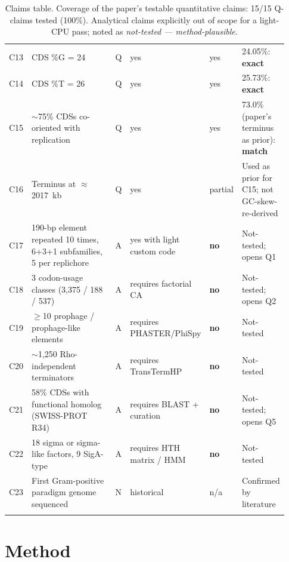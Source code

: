 \documentclass[11pt,letterpaper]{article}
\begin{document}
\begin{longtable}{@{}p{0.03\linewidth}p{0.55\linewidth}p{0.05\linewidth}p{0.12\linewidth}p{0.08\linewidth}p{0.10\linewidth}@{}}
C13 & CDS \%G = 24                                                                 & Q & yes                       & yes     & 24.05\%: \textbf{exact} \\
C14 & CDS \%T = 26                                                                 & Q & yes                       & yes     & 25.73\%: \textbf{exact} \\
C15 & $\sim$75\% CDSs co-oriented with replication                                 & Q & yes                       & yes     & 73.0\% (paper's terminus as prior): \textbf{match} \\
C16 & Terminus at $\approx$ \SI{2017}{kb}                                          & Q & yes                       & partial & Used as prior for C15; not GC-skew-re-derived \\
C17 & 190-bp element repeated 10 times, 6+3+1 subfamilies, 5 per replichore        & A & yes with light custom code& \textbf{no}      & Not-tested; opens Q1 \\
C18 & 3 codon-usage classes (3,375 / 188 / 537)                                    & A & requires factorial CA     & \textbf{no}      & Not-tested; opens Q2 \\
C19 & $\geq$10 prophage / prophage-like elements                                   & A & requires PHASTER/PhiSpy   & \textbf{no}      & Not-tested \\
C20 & $\sim$1,250 Rho-independent terminators                                      & A & requires TransTermHP      & \textbf{no}      & Not-tested \\
C21 & 58\% CDSs with functional homolog (SWISS-PROT R34)                           & A & requires BLAST + curation & \textbf{no}      & Not-tested; opens Q5 \\
C22 & 18 sigma or sigma-like factors, 9 SigA-type                                  & A & requires HTH matrix / HMM & \textbf{no}      & Not-tested \\
C23 & First Gram-positive paradigm genome sequenced                                & N & historical                & n/a     & Confirmed by literature \\
\bottomrule
\caption{Claims table. Coverage of the paper's testable quantitative claims: 15/15 Q-claims tested (100\%). Analytical claims explicitly out of scope for a light-CPU pass; noted as \emph{not-tested --- method-plausible}.}
\end{longtable}

\section{Method}
\label{sec:method}
\end{document}
